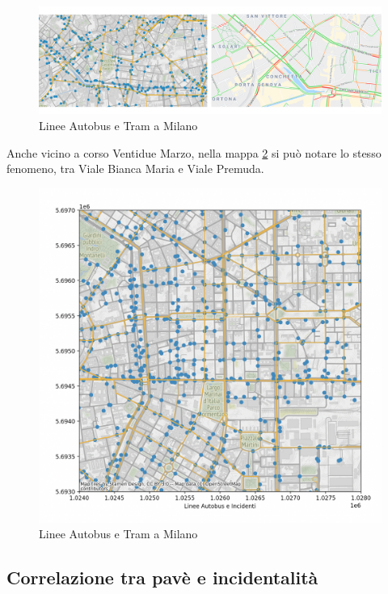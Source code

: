 \documentclass[a4paper]{report}
\begin{document}
\begin{figure}
    \includegraphics[width=\linewidth]{../src/atm/navigli.png}
    \caption{Linee Autobus e Tram a Milano}
    \label{fig:navigli}
\end{figure}

Anche vicino a corso Ventidue Marzo, nella mappa \ref{fig:22-marzo} si può 
notare lo stesso fenomeno, tra Viale Bianca Maria e Viale Premuda.

\begin{figure}
    \includegraphics[width=\linewidth]{../src/atm/22_marzo.png}
    \caption{Linee Autobus e Tram a Milano}
    \label{fig:22-marzo}
\end{figure}


\subsection{Correlazione tra pavè e incidentalità}
\end{document}
